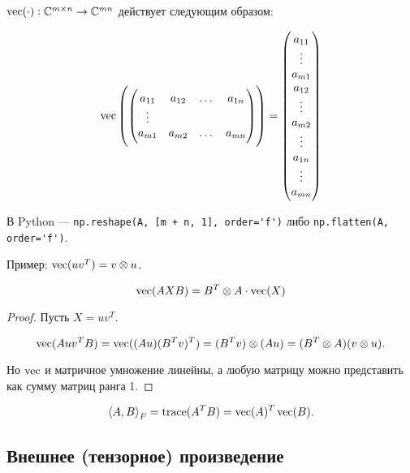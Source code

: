 \begin{definition}
    $\operatorname{vec}(\cdot): \mathbb{C}^{m \times n} \to \mathbb{C}^{m n}$ действует следующим образом:

    \[
        \operatorname{vec} \left(
            \begin{pmatrix}
                a_{1 1} & a_{1 2} & \dots & a_{1 n} \\
                \vdots \\
                a_{m 1} & a_{m 2} & \dots & a_{m n}
            \end{pmatrix}
        \right) = \begin{pmatrix}
            a_{1 1} \\ \vdots \\ a_{m 1} \\ a_{1 2} \\ \vdots \\ a_{m 2} \\
            \vdots \\
            a_{1 n} \\ \vdots \\ a_{m n}
        \end{pmatrix}
    \]
\end{definition}

В Python --- \verb|np.reshape(A, [m + n, 1], order='f')| либо
\verb|np.flatten(A, order='f')|.

Пример: $\operatorname{vec}(u v^T) = v \otimes u$.

\begin{point}
    \[
        \operatorname{vec}(A X B) = B^T \otimes A \cdot \operatorname{vec}(X)
    \]
\end{point}

\begin{proof}
    Пусть $X = u v^T$.

    \[
        \operatorname{vec}(A u v^T B) = \operatorname{vec}((A u) (B^T v)^T)
        = (B^T v) \otimes (A u) = (B^T \otimes A) (v \otimes u).
    \]

    Но $\operatorname{vec}$ и матричное умножение линейны, а любую матрицу можно представить
    как сумму матриц ранга 1.
\end{proof}

\begin{point}
    \[
        \left< A, B \right>_F = \operatorname{trace}(A^T B) = \operatorname{vec}(A)^T \operatorname{vec}(B).
    \]
\end{point}

\subsection{Внешнее (тензорное) произведение}

